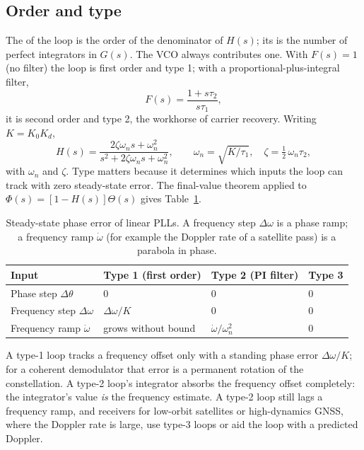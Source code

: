 \subsection{Order and type}

The  of the loop is the order of the denominator of $H(s)$; its  is the number
of perfect integrators in $G(s)$. The VCO always contributes one. With $F(s)=1$ (no filter) the
loop is first order and type 1; with a proportional-plus-integral filter,
\begin{equation}
F(s)=\frac{1+s\tau_2}{s\tau_1},
\end{equation}
it is second order and type 2, the workhorse of carrier recovery. Writing $K=K_0K_d$,
\begin{equation}
H(s)=\frac{2\zeta\omega_ns+\omega_n^2}{s^2+2\zeta\omega_ns+\omega_n^2},\qquad
\omega_n=\sqrt{K/\tau_1},\quad \zeta=\tfrac12\,\omega_n\tau_2,
\label{eq:ch10:H2}
\end{equation}
with  $\omega_n$ and  $\zeta$. Type matters because it
determines which inputs the loop can track with zero steady-state error. The final-value theorem
applied to $\Phi(s)=[1-H(s)]\Theta(s)$ gives Table~\ref{tab:ch10:steady}.

\begin{table}[htbp]\centering\small
\caption{Steady-state phase error of linear PLLs. A frequency step $\Delta\omega$ is a phase ramp; a
frequency ramp $\dot\omega$ (for example the Doppler rate of a satellite pass) is a parabola in phase.}
\label{tab:ch10:steady}
\begin{tabular}{llll}
\toprule
Input & Type 1 (first order) & Type 2 (PI filter) & Type 3 \\
\midrule
Phase step $\Delta\theta$ & 0 & 0 & 0 \\
Frequency step $\Delta\omega$ & $\Delta\omega/K$ & 0 & 0 \\
Frequency ramp $\dot\omega$ & grows without bound & $\dot\omega/\omega_n^2$ & 0 \\
\bottomrule
\end{tabular}
\end{table}

A type-1 loop tracks a frequency offset only with a standing phase error $\Delta\omega/K$; for a
coherent demodulator that error is a permanent rotation of the constellation. A type-2 loop's
integrator absorbs the frequency offset completely: the integrator's value \emph{is} the frequency
estimate. A type-2 loop still lags a frequency ramp, and receivers for low-orbit satellites or
high-dynamics GNSS, where the Doppler rate is large, use type-3 loops or aid the loop with a
predicted Doppler.

